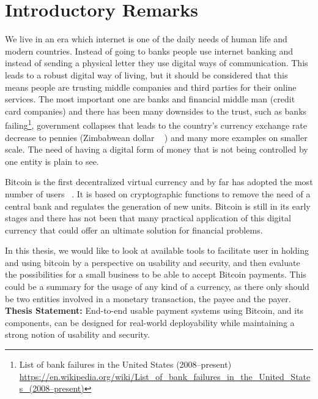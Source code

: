 


\chapter{Introductory Remarks}

\setcounter{page}{1}

We live in an era which internet is one of the daily needs of human life and modern countries. Instead of going to banks people use internet banking and instead of sending a physical letter they use digital ways of communication. This leads to a robust digital way of living, but it should be considered that this means people are trusting middle companies and third parties for their online services. The most important one are banks and financial middle man (\eg credit card companies) and there has been many downsides to the trust, such as banks failing\footnote{List of bank failures in the United States (2008–present) \url{https://en.wikipedia.org/wiki/List_of_bank_failures_in_the_United_States_(2008–present)}}, government collapses that leads to the country's currency exchange rate decrease to pennies (\eg Zimbabwean dollar ~\cite{hanke2009measurement} ) and many more examples on smaller scale. The need of having a digital form of money that is not being controlled by one entity is plain to see.

Bitcoin is the first decentralized virtual currency and by far has adopted the most number of users ~\cite{Nak08}. It is based on cryptographic functions to remove the need of a central bank and regulates the generation of new units. Bitcoin is still in its early stages and there has not been that many practical application of this digital currency that could offer an ultimate solution for financial problems.

In this thesis, we would like to look at available tools to facilitate user in holding and using bitcoin by a perspective on usability and security, and then evaluate the possibilities for a small business to be able to accept Bitcoin payments. This could be a summary for the usage of any kind of a currency, as there only should be two entities involved in a monetary transaction, the payee and the payer.\\

\textbf{Thesis Statement:} End-to-end usable payment systems using Bitcoin, and its components, can be designed for real-world deployability while maintaining a strong notion of usability and security.

